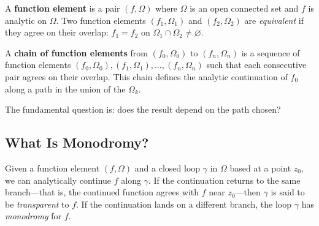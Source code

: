 A \textbf{function element} is a pair $(f, \Omega)$ where $\Omega$ is an open connected set and $f$ is analytic on $\Omega$. Two function elements $(f_1, \Omega_1)$ and $(f_2, \Omega_2)$ are \emph{equivalent} if they agree on their overlap: $f_1 = f_2$ on $\Omega_1 \cap \Omega_2 \neq \varnothing$.

A \textbf{chain of function elements} from $(f_0, \Omega_0)$ to $(f_n, \Omega_n)$ is a sequence of function elements $(f_0, \Omega_0), (f_1, \Omega_1), \ldots, (f_n, \Omega_n)$ such that each consecutive pair agrees on their overlap. This chain defines the analytic continuation of $f_0$ along a path in the union of the $\Omega_k$.

The fundamental question is: does the result depend on the path chosen?

\subsection{What Is Monodromy?}

Given a function element $(f, \Omega)$ and a closed loop $\gamma$ in $\Omega$ based at a point $z_0$, we can analytically continue $f$ along $\gamma$. If the continuation returns to the same branch---that is, the continued function agrees with $f$ near $z_0$---then $\gamma$ is said to be \emph{transparent} to $f$. If the continuation lands on a different branch, the loop $\gamma$ has \emph{monodromy} for $f$.

